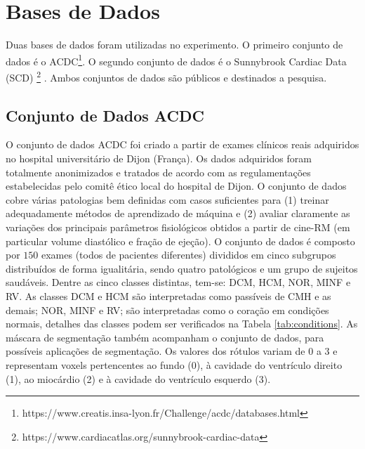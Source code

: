 \section{Bases de Dados} 
\label{subsec:cap4_dataset}

Duas bases de dados foram utilizadas no experimento. O primeiro conjunto de dados é o \gls{ACDC}\footnote{https://www.creatis.insa-lyon.fr/Challenge/acdc/databases.html}. O segundo conjunto de dados é o Sunnybrook Cardiac Data (SCD) \footnote{https://www.cardiacatlas.org/sunnybrook-cardiac-data} \cite{radauEvaluationFrameworkAlgorithms2009}. Ambos conjuntos de dados são públicos e destinados a pesquisa.

\subsection{Conjunto de Dados ACDC} 
\label{subsec:cap4_acdc}

O conjunto de dados \gls{ACDC} foi criado a partir de exames clínicos reais adquiridos no hospital universitário de Dijon (França). Os dados adquiridos foram totalmente anonimizados e tratados de acordo com as regulamentações estabelecidas pelo comitê ético local do hospital de Dijon. O conjunto de dados cobre várias patologias bem definidas com casos suficientes para (1) treinar adequadamente métodos de aprendizado de máquina e (2) avaliar claramente as variações dos principais parâmetros fisiológicos obtidos a partir de cine-RM (em particular volume diastólico e fração de ejeção). O conjunto de dados é composto por $150$ exames (todos de pacientes diferentes) divididos em cinco subgrupos distribuídos de forma igualitária, sendo quatro patológicos e um grupo de sujeitos saudáveis. Dentre as cinco classes distintas, tem-se: \gls{DCM}, \gls{HCM}, \gls{NOR}, \gls{MINF} e \gls{RV}. As classes \gls{DCM} e \gls{HCM} são interpretadas como passíveis de \gls{CMH} e as demais; \gls{NOR}, \gls{MINF} e \gls{RV}; são interpretadas como o coração em condições normais, detalhes das classes podem ser verificados na Tabela \ref{tab:conditions}. As máscara de segmentação também acompanham o conjunto de dados, para possíveis aplicações de segmentação. Os valores dos rótulos variam de $0$ a $3$ e representam voxels pertencentes ao fundo (0), à cavidade do ventrículo direito (1), ao miocárdio (2) e à cavidade do ventrículo esquerdo (3).

